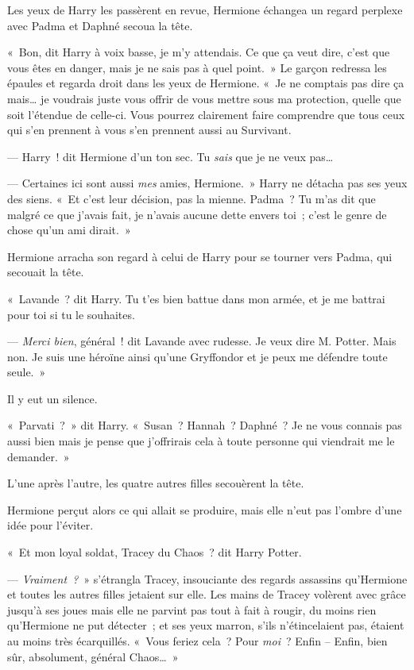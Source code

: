 Les yeux de Harry les passèrent en revue, Hermione échangea un regard perplexe avec Padma et Daphné secoua la tête.

«~Bon, dit Harry à voix basse, je m'y attendais.
Ce que ça veut dire, c'est que vous êtes en danger, mais je ne sais pas à quel point.~»
Le garçon redressa les épaules et regarda droit dans les yeux de Hermione.
«~Je ne comptais pas dire ça mais… je voudrais juste vous offrir de vous mettre sous ma protection, quelle que soit l'étendue de celle-ci.
Vous pourrez clairement faire comprendre que tous ceux qui s'en prennent à vous s'en prennent aussi au Survivant.

--- Harry~! dit Hermione d'un ton sec.
Tu \emph{sais} que je ne veux pas…

--- Certaines ici sont aussi \emph{mes} amies, Hermione.~»
Harry ne détacha pas ses yeux des siens.
«~Et c'est leur décision, pas la mienne.
Padma~? Tu m'as dit que malgré ce que j'avais fait, je n'avais aucune dette envers toi~; c'est le genre de chose qu'un ami dirait.~»

Hermione arracha son regard à celui de Harry pour se tourner vers Padma, qui secouait la tête.

«~Lavande~? dit Harry.
Tu t'es bien battue dans mon armée, et je me battrai pour toi si tu le souhaites.

--- \emph{Merci bien}, général~! dit Lavande avec rudesse.
Je veux dire M. Potter.
Mais non.
Je suis une héroïne ainsi qu'une Gryffondor et je peux me défendre toute seule.~»

Il y eut un silence.

«~Parvati~?~»
dit Harry.
«~Susan~?
Hannah~?
Daphné~?
Je ne vous connais pas aussi bien mais je pense que j'offrirais cela à toute personne qui viendrait me le demander.~»

L'une après l'autre, les quatre autres filles secouèrent la tête.

Hermione perçut alors ce qui allait se produire, mais elle n'eut pas l'ombre d'une idée pour l'éviter.

«~Et mon loyal soldat, Tracey du Chaos~? dit Harry Potter.

--- \emph{Vraiment~?}~» s'étrangla Tracey, insouciante des regards assassins qu'Hermione et toutes les autres filles jetaient sur elle.
Les mains de Tracey volèrent avec grâce jusqu'à ses joues mais elle ne parvint pas tout à fait à rougir, du moins rien qu'Hermione ne put détecter~; et ses yeux marron, s'ils n'étincelaient pas, étaient au moins très écarquillés.
«~Vous feriez cela~?
Pour \emph{moi}~?
Enfin -- Enfin, bien sûr, absolument, général Chaos…~»

